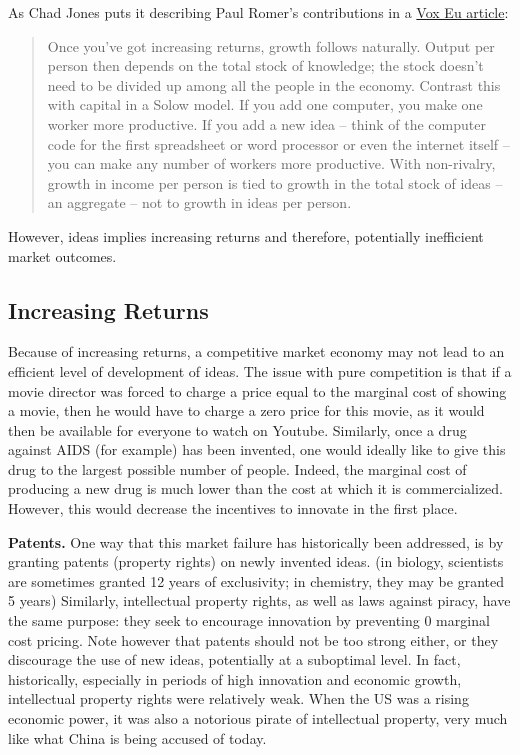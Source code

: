 \documentclass[]{book}
\begin{document}
As Chad Jones puts it describing Paul Romer's contributions in a
\href{https://voxeu.org/article/new-ideas-about-new-ideas-paul-romer-nobel-laureate}{Vox
Eu article}:

\begin{quote}
Once you've got increasing returns, growth follows naturally. Output per
person then depends on the total stock of knowledge; the stock doesn't
need to be divided up among all the people in the economy. Contrast this
with capital in a Solow model. If you add one computer, you make one
worker more productive. If you add a new idea -- think of the computer
code for the first spreadsheet or word processor or even the internet
itself -- you can make any number of workers more productive. With
non-rivalry, growth in income per person is tied to growth in the total
stock of ideas -- an aggregate -- not to growth in ideas per person.
\end{quote}

However, ideas implies increasing returns and therefore, potentially
inefficient market outcomes.

\subsection{Increasing Returns}\label{increasing-returns}

Because of increasing returns, a competitive market economy may not lead
to an efficient level of development of ideas. The issue with pure
competition is that if a movie director was forced to charge a price
equal to the marginal cost of showing a movie, then he would have to
charge a zero price for this movie, as it would then be available for
everyone to watch on Youtube. Similarly, once a drug against AIDS (for
example) has been invented, one would ideally like to give this drug to
the largest possible number of people. Indeed, the marginal cost of
producing a new drug is much lower than the cost at which it is
commercialized. However, this would decrease the incentives to innovate
in the first place.

\textbf{Patents.} One way that this market failure has historically been
addressed, is by granting patents (property rights) on newly invented
ideas. (in biology, scientists are sometimes granted 12 years of
exclusivity; in chemistry, they may be granted 5 years) Similarly,
intellectual property rights, as well as laws against piracy, have the
same purpose: they seek to encourage innovation by preventing 0 marginal
cost pricing. Note however that patents should not be too strong either,
or they discourage the use of new ideas, potentially at a suboptimal
level. In fact, historically, especially in periods of high innovation
and economic growth, intellectual property rights were relatively weak.
When the US was a rising economic power, it was also a notorious pirate
of intellectual property, very much like what China is being accused of
today.
\end{document}
